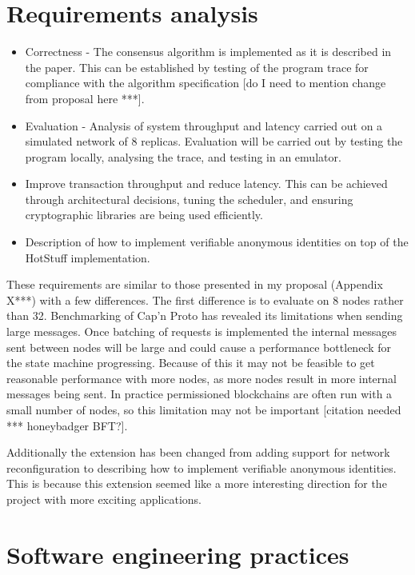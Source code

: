 \section{Requirements analysis}
\begin{itemize}
	\item Correctness - The consensus algorithm is implemented as it is described in the paper. This can be established by testing of the program trace for compliance with the algorithm specification [do I need to mention change from proposal here ***].
	\item Evaluation - Analysis of system throughput and latency carried out on a simulated network of 8 replicas. Evaluation will be carried out by testing the program locally, analysing the trace, and testing in an emulator.
	\item Improve transaction throughput and reduce latency. This can be achieved through architectural decisions, tuning the scheduler, and ensuring cryptographic libraries are being used efficiently.
	\item Description of how to implement verifiable anonymous identities on top of the HotStuff implementation.
\end{itemize}

These requirements are similar to those presented in my proposal (Appendix X***) with a few differences. The first difference is to evaluate on 8 nodes rather than 32. Benchmarking of Cap'n Proto has revealed its limitations when sending large messages. Once batching of requests is implemented the internal messages sent between nodes will be large and could cause a performance bottleneck for the state machine progressing. Because of this it may not be feasible to get reasonable performance with more nodes, as more nodes result in more internal messages being sent. In practice permissioned blockchains are often run with a small number of nodes, so this limitation may not be important [citation needed *** honeybadger BFT?].

Additionally the extension has been changed from adding support for network reconfiguration to describing how to implement verifiable anonymous identities. This is because this extension seemed like a more interesting direction for the project with more exciting applications.

\section{Software engineering practices}
